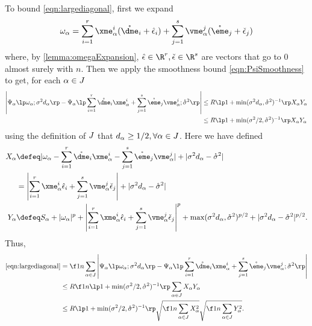 \documentclass[main.tex]{subfiles}
\begin{document}
To bound \cref{eqn:largediagonal}, first we expand
\[
\omega_\alpha =
\sum_{i=1}^r \xme_\alpha^i (\mathring {\dme}_i + \hat \epsilon_i)
+ \sum_{j=1}^s \vme_\alpha^j (\mathring {\eme}_j + \check \epsilon_j)
\]
where, by \cref{lemma:omegaExpansion}, $\hat \epsilon \in \R^r, \check \epsilon \in \R^s$ are vectors that go to 0 almost surely with $n$.
Then we apply the smoothness bound \cref{eqn:PsiSmoothness} to get, for each $\alpha \in J$
\begin{align*}
    \left|
    \Psi_\alpha\lp \omega_\alpha; \sigma^2 d_\alpha\rp
    -
    \Psi_\alpha\lp
      \sum_{i=1}^r \mathring {\dme}_i \xme^i_\alpha +
        \sum_{j=1}^s \mathring {\eme}_j \vme^j_\alpha
        ; \mathring \sigma^2 \rp
    \right|
    &\le
        R
        \lp 1 + \min(\sigma^2 d_\alpha, \mathring \sigma^2)^{-1} \rp
        X_\alpha
        Y_\alpha
        \\
    &\le
        R
        \lp 1 + \min(\sigma^2/2, \mathring \sigma^2)^{-1} \rp
        X_\alpha
        Y_\alpha
\end{align*}
using the definition of $J$ that $d_\alpha \ge 1/2, \forall \alpha \in J$.
Here we have defined
\begin{align*}
X_\alpha
    &\defeq
        |\omega_\alpha - 
          \sum_{i=1}^r \mathring {\dme}_i \xme^i_\alpha -
            \sum_{j=1}^s \mathring {\eme}_j \vme^j_\alpha|
        + |\sigma^2 d_\alpha - \mathring \sigma^2|
        \\
    &=
        \left|\sum_{i=1}^r \xme_\alpha^i \hat \epsilon_i
                + \sum_{j=1}^s \vme_\alpha^j \check \epsilon_j
        \right|
        + |\sigma^2 d_\alpha - \mathring \sigma^2|
        \\
Y_\alpha
    &\defeq
        S_\alpha + |\omega_\alpha|^p
        + \left|\sum_{i=1}^r \xme_\alpha^i \hat \epsilon_i
                + \sum_{j=1}^s \vme_\alpha^j \check \epsilon_j
        \right|^p
        + \max(\sigma^2 d_\alpha, \mathring \sigma^2)^{p/2}
        + |\sigma^2 d_\alpha - \mathring \sigma^2|^{p/2}
        .
        \\
\end{align*}
Thus,
\begin{align*}
\cref{eqn:largediagonal}
    &=
        \f 1 n \sum_{\alpha\in \JJc}
        \left|
        \Psi_\alpha\lp \omega_\alpha; \sigma^2 d_\alpha\rp
        -
        \Psi_\alpha\lp
          \sum_{i=1}^r \mathring {\dme}_i \xme^i_\alpha +
            \sum_{j=1}^s \mathring {\eme}_j \vme^j_\alpha;
          \mathring \sigma^2 \rp
        \right|
        \\
    &\le
        R
        \f 1 n
        \lp 1 + \min(\sigma^2/2, \mathring \sigma^2)^{-1} \rp
        \sum_{\alpha \in \JJc}
            X_\alpha
            Y_\alpha
        \\
    &\le
        R
        \lp 1 + \min(\sigma^2/2, \mathring \sigma^2)^{-1} \rp
        \sqrt{\f 1 n \sum_{\alpha \in \JJc}
            X_\alpha^2}
        \sqrt{\f 1 n \sum_{\alpha \in \JJc}
            Y_\alpha^2
            }
        .
\end{align*}
\end{document}
